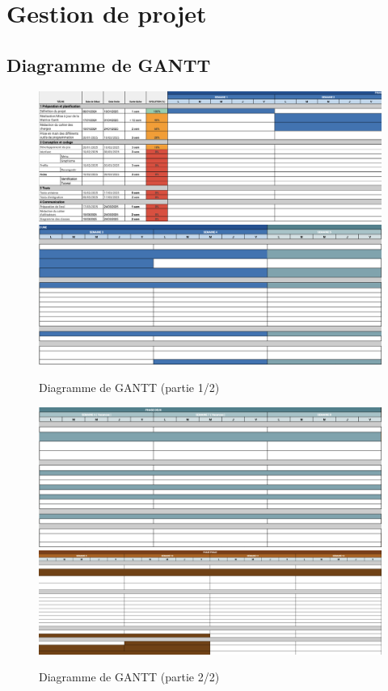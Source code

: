 \newpage\wPt\vspace{-3cm}
\section{Gestion de projet}
\nopagebreak
\subsection{Diagramme de GANTT}
\wPt
{}
\begin{figure}[ht]
    \centering
    \includegraphics[width=17cm]{Annexe/gantt1.png}
    \includegraphics[width=17cm]{Annexe/gantt2.png}
	\caption{Diagramme de GANTT (partie 1/2)}
	\label{fig:GANTT1}
\end{figure}
\begin{figure}[ht]
    \centering
    \includegraphics[width=17cm]{Annexe/gantt3.png}
    \includegraphics[width=17cm]{Annexe/gantt4.png}
	\caption{Diagramme de GANTT (partie 2/2)}
	\label{fig:GANTT2}
\end{figure}
\newpage